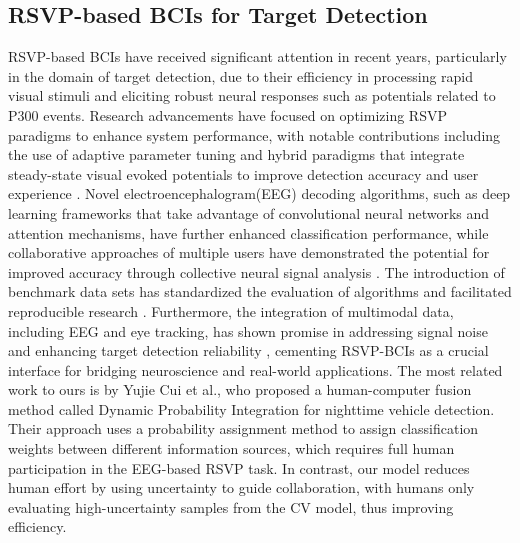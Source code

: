 \documentclass[preprint,12pt,authoryear]{elsarticle}
\begin{document}
\subsection{RSVP-based BCIs for Target Detection}
RSVP-based BCIs have received significant attention in recent years, particularly in the domain of target detection, due to their efficiency in processing rapid visual stimuli and eliciting robust neural responses such as potentials related to P300 events. Research advancements have focused on optimizing RSVP paradigms to enhance system performance, with notable contributions including the use of adaptive parameter tuning and hybrid paradigms that integrate steady-state visual evoked potentials to improve detection accuracy and user experience \cite{jalilpour2020novel}. Novel electroencephalogram(EEG) decoding algorithms, such as deep learning frameworks that take advantage of convolutional neural networks \cite{santamaria2020eeg} and attention mechanisms\cite{wang2020linking}, have further enhanced classification performance, while collaborative approaches of multiple users have demonstrated the potential for improved accuracy through collective neural signal analysis \cite{9931160}. The introduction of benchmark data sets has standardized the evaluation of algorithms and facilitated reproducible research \cite{zhang2020benchmark}. Furthermore, the integration of multimodal data, including EEG and eye tracking, has shown promise in addressing signal noise and enhancing target detection reliability \cite{mao2023cross}, cementing RSVP-BCIs as a crucial interface for bridging neuroscience and real-world applications. The most related work to ours is by Yujie Cui et al.\cite{cui2022dynamic}, who proposed a human-computer fusion method called Dynamic Probability Integration for nighttime vehicle detection. Their approach uses a probability assignment method to assign classification weights between different information sources, which requires full human participation in the EEG-based RSVP task. In contrast, our model reduces human effort by using uncertainty to guide collaboration, with humans only evaluating high-uncertainty samples from the CV model, thus improving efficiency.
\end{document}
